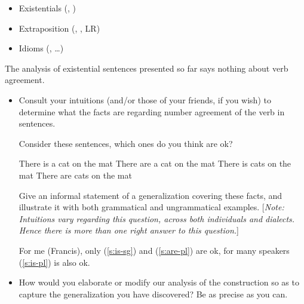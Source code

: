 \documentclass[a4paper,landscape,headrule,footrule]{foils}
\begin{document}

\begin{itemize}
\item Existentials (, )
\item Extraposition (, , LR)
\item Idioms (, \ldots)
\end{itemize}


The analysis of existential  sentences presented so far
says nothing about verb agreement.

\begin{itemize}
\item[A.] Consult your intuitions (and/or those of your friends, if
  you wish) to determine what the facts are regarding number
 agreement of the verb in  sentences.

 Consider these sentences, which ones do you think are ok?

  \begin{exe}
    \ex\label{s:is-sg} There is a cat on the mat
    \ex\label{s:are-sg} There are a cat on the mat
    \ex\label{s:is-pl} There is cats on the mat
    \ex\label{s:are-pl} There are cats on the mat
  \end{exe}


  Give an informal
  statement of a generalization covering these facts, and illustrate
  it with both grammatical and ungrammatical examples.  [{\sl Note:
    Intuitions vary regarding this question, across both individuals
    and dialects.  Hence there is more than one right answer to this
    question.}]

  For me (Francis), only (\ref{s:is-sg}) and (\ref{s:are-pl}) are ok,
  for many speakers (\ref{s:is-pl}) is also ok.

  
  
\item[B.] How would you elaborate or modify our analysis of the 
  construction so as to capture the generalization you have discovered?
  Be as precise as you can.
\end{itemize}


\end{document}
